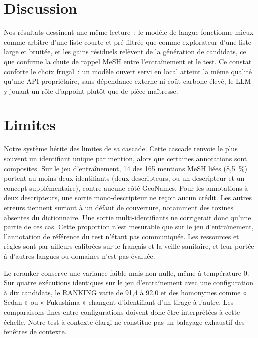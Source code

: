 \documentclass[10pt,twoside]{article}
\begin{document}
\section{Discussion}
\label{sec:discussion}

Nos résultats dessinent une même lecture~: le modèle de langue fonctionne mieux comme arbitre d'une
liste courte et pré-filtrée que comme explorateur d'une liste large et bruitée, et les gains
résiduels relèvent de la génération de candidats, ce que confirme la chute de rappel MeSH entre
l'entraînement et le test. Ce constat conforte le choix frugal~: un modèle ouvert servi en local
atteint la même qualité qu'une API propriétaire, sans dépendance externe ni coût carbone élevé, le
LLM y jouant un rôle d'appoint plutôt que de pièce maîtresse.

\section{Limites}
\label{sec:limites}

Notre système hérite des limites de sa cascade. Cette cascade renvoie le plus souvent un identifiant unique
par mention, alors que certaines annotations sont composites. Sur le jeu d'entraînement, 14 des 165 mentions MeSH
liées (8,5~\%) portent au moins deux identifiants (deux descripteurs, ou un descripteur et un concept
supplémentaire), contre aucune côté GeoNames. Pour les annotations à deux descripteurs, une sortie
mono-descripteur ne reçoit aucun crédit. Les autres erreurs tiennent surtout à un défaut de
couverture, notamment des toxines absentes du dictionnaire. Une sortie multi-identifiants ne
corrigerait donc qu'une partie de ces cas. Cette proportion n'est mesurable que sur le jeu d'entraînement, l'annotation
de référence du test n'étant pas communiquée. Les ressources et règles sont par ailleurs calibrées
sur le français et la veille sanitaire, et leur portée à d'autres langues ou domaines n'est pas
évaluée.

Le reranker conserve une variance faible mais non nulle, même à température 0. Sur
quatre exécutions identiques sur le jeu d'entraînement avec une configuration à dix candidats, le RANKING
varie de 91,4 à 92,0 et des homonymes comme « Sedan » ou « Fukushima » changent d'identifiant
d'un tirage à l'autre. Les comparaisons fines
entre configurations doivent donc être interprétées à cette échelle. Notre test à contexte élargi ne constitue
pas un balayage exhaustif des fenêtres de contexte.
\end{document}
